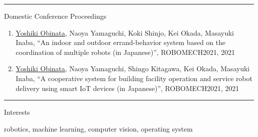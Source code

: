 \documentclass[a4paper,10pt]{article}
\newlength{\cvcolumngapwidth}
\newlength{\cvleftcolumnwidth}
\newlength{\cvrightcolumnwidth}
\newcommand{\cvsectionstyle}[1]{{\normalsize\cvsectionfont\textcolor{cvsectioncolor}{#1}}}
\newcommand{\cvheadingstyle}[1]{{\normalsize\cvheadingfont\textcolor{cvheadingcolor}{#1}}}
\newlength{\cvafteritemskipamount}
\newlength{\cvaftersectionskipamount}
\newlength{\cvbetweensectionandheadingextraskipamount}
\newlength{\cvparskip}
\newcommand{\cvsection}[1]{
    \begin{minipage}[t]{\cvleftcolumnwidth}
        \raggedleft\cvsectionstyle{#1}
    \end{minipage}%
    \hspace{\cvcolumngapwidth}%
    \begin{minipage}[t]{\cvrightcolumnwidth}
        \textcolor{cvrulecolor}{\rule{\cvrightcolumnwidth}{0.3mm}}
    \end{minipage}

    \vspace{\cvaftersectionskipamount}
}
\newcommand{\cvitem}[2]{
    \begin{minipage}[t]{\cvleftcolumnwidth}
        \raggedleft #1
    \end{minipage}%
    \hspace{\cvcolumngapwidth}%
    \begin{minipage}[t]{\cvrightcolumnwidth}
        \setlength{\parskip}{\cvparskip} #2
    \end{minipage}

    \vspace{\cvafteritemskipamount}
}
\begin{document}

\cvsection{PUBLICATIONS}

\vspace{\cvbetweensectionandheadingextraskipamount}

\cvitem{
  \cvheadingstyle{Domestic Conference Proceedings}
}{
  \begin{enumerate}
  \item \underline{Yoshiki Obinata}, Naoya Yamaguchi, Koki Shinjo, Kei Okada, Masayuki Inaba, ``An indoor and outdoor errand-behavior system based on the coordination of multiple robots (in Japanese)'', ROBOMECH2021, 2021
  \item \underline{Yoshiki Obinata}, Naoya Yamaguchi, Shingo Kitagawa, Kei Okada, Masayuki Inaba, ``A cooperative system for building facility operation and service robot delivery using smart IoT devices (in Japanese)'', ROBOMECH2021, 2021


  \end{enumerate}
}



\cvsection{ADDITIONAL INFORMATION}

\vspace{\cvbetweensectionandheadingextraskipamount}


\cvitem{
    \cvheadingstyle{Interests}
}{
    robotics, machine learning, computer vision, operating system
}
\end{document}
